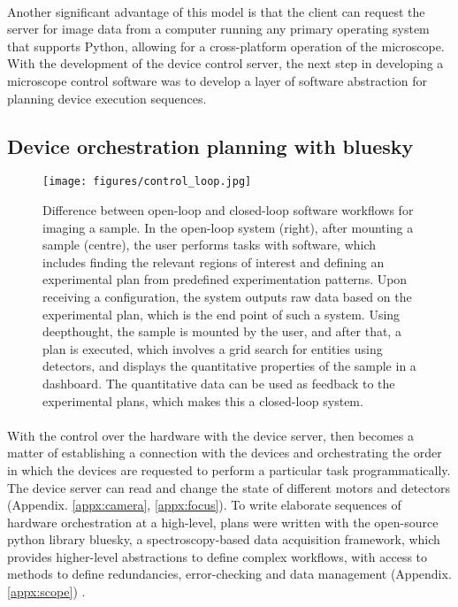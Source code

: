 \paragraph*{} Another significant advantage of this model is that the client can request the server for image data from a computer running any primary operating system that supports Python, allowing for a cross-platform operation of the microscope. With the development of the device control server, the next step in developing a microscope control software was to develop a layer of software abstraction for planning device execution sequences.

\subsection{Device orchestration planning with bluesky}

\begin{figure}[h]
    {\hfill\texttt{[image: figures/control\_loop.jpg]}\hspace*{\fill}}
    \caption{Difference between open-loop and closed-loop software workflows for imaging a sample. In the open-loop system (right), after mounting a sample (centre), the user performs tasks with software, which includes finding the relevant regions of interest and defining an experimental plan from predefined experimentation patterns. Upon receiving a configuration, the system outputs raw data based on the experimental plan, which is the end point of such a system. Using deepthought, the sample is mounted by the user, and after that, a plan is executed, which involves a grid search for entities using detectors, and displays the quantitative properties of the sample in a dashboard. The quantitative data can be used as feedback to the experimental plans, which makes this a closed-loop system.}
    {\label{fig:control_loop}}
\end{figure}


\paragraph*{} With the control over the hardware with the device server, then becomes a matter of establishing a connection with the devices and orchestrating the order in which the devices are requested to perform a particular task programmatically. The device server can read and change the state of different motors and detectors (Appendix. \ref{appx:camera}, \ref{appx:focus}). To write elaborate sequences of hardware orchestration at a high-level, plans were written with the open-source python library bluesky, a spectroscopy-based data acquisition framework, which provides higher-level abstractions to define complex workflows, with access to methods to define redundancies, error-checking and data management (Appendix. \ref{appx:scope}) \cite{allan2019bluesky}.

